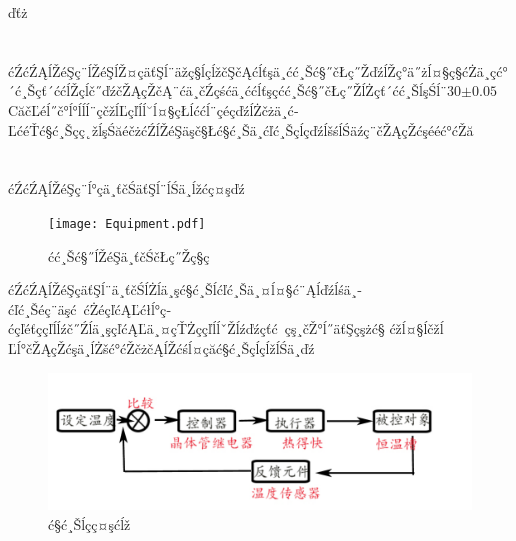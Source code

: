 ďťż\documentclass[10.5pt]{article}
\begin{document}
\title{\textbf{}} %
\author{}
\date{}
\maketitle
\section{\textbf{}}
ćŹćŹĄĺŽéŞç¨ĺŽéŞĺŽ¤çäťŞĺ¨äžç§ĺçĺžčŞčĄć­ĺťşä¸ćć¸Šć§˝čŁç˝ŽďźĺŽç°ä˝żĺ¤§ç§ćŻä¸­çć°´ć¸Šçť´ććĺŽçĺč˝ďźčŽĄçŽčĄ¨ćä¸čŹçśćä¸ćć­ĺťşçćć¸Šć§˝čŁç˝ŽĺŻçť´ćć¸ŠĺşŚĺ¨30$\pm0.05$\degree CăčĽéĺ˝č°ĺ°ĺĺĺ¨çčžĺĽçľĺĺ˘ĺ¤§çŁĺććĺ¨çéçďźĺŻčżä¸ć­ĽćéŤć§ć¸Šçç˛žĺşŚăéčżćŹĺŽéŞäşč§Łć§ć¸Šä¸ćľć¸Šçĺçďźĺšśĺ­Śäźç¨čŽĄçŽćşééć°ćŽă
\section{\textbf{}}
\subsection{\textbf{}}
ćŹćŹĄĺŽéŞç¨ĺ°çä¸ťčŚäťŞĺ¨ĺŚä¸ĺžćç¤şďź
\begin{figure}[!ht]
\centering
\caption{ćć¸Šć§˝ĺŽéŞä¸ťčŚčŁç˝Žç§ç}
\texttt{[image: Equipment.pdf]}
\end{figure}


ćŹćŹĄĺŽéŞçäťŞĺ¨ä¸ťčŚĺŻĺä¸şć§ć¸Šĺćľć¸Šä¸¤ĺ¤§ć¨Ąĺďźĺśä¸­ćľć¸Šéç¨äşć ćŻéçľćĄĽćłĺ°ç­ćçľéťççľĺĺźč˝Źĺä¸şçľćĄĽä¸¤çŤŻççľĺĺˇŽĺźďźçťć çş¸čŽ°ĺ˝äťŞçşżć§
ćžĺ¤§ĺčžĺĽĺ°čŽĄçŽćşä¸­ĺŻšć°ćŽčżčĄĺŽćśĺ¤çăć§ć¸ŠçĺçĺžĺŚä¸ďź
\begin{figure}[!ht]
\centering
\caption{ć§ć¸Šĺçç¤şćĺž}
\includegraphics[width=400pt]{PrincipleFigure01.pdf}
\end{figure}
\end{document}
